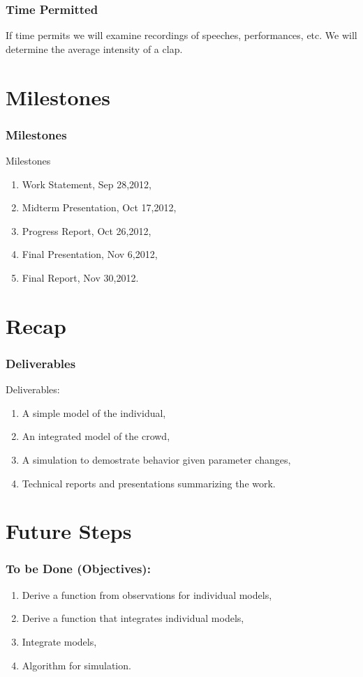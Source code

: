 \documentclass[compress,handout,10pt]{beamer}
\let\olditem\item
\renewcommand{\item}{\setlength{\itemsep}{0.5\baselineskip}\olditem}
\begin{document}
\begin{frame}
\frametitle{Time Permitted}
If time permits we will examine recordings of speeches, performances, etc. We will determine the average intensity of a clap.\\
\end{frame}

\section{Milestones}
\begin{frame}
\frametitle{Milestones}
Milestones
\begin{enumerate}
                 \item Work Statement, Sep 28,2012,
                 \item Midterm Presentation, Oct 17,2012,
                 \item Progress Report, Oct 26,2012,
                 \item Final Presentation, Nov 6,2012,
                 \item Final Report, Nov 30,2012.
             \end{enumerate}

\end{frame}
\section{Recap}
\begin{frame}
\frametitle{ Deliverables}
 Deliverables:
 \vspace{7pt}
	\begin{enumerate}
		\item A simple model of the individual,
		\item An integrated model of the crowd,
		\item A simulation to demostrate behavior given parameter changes,
		\item Technical reports and presentations summarizing the work.
	\end{enumerate}
\end{frame}
\section{Future Steps}
\begin{frame}

  \frametitle{To be Done (Objectives):}
	\begin{enumerate}
		\item Derive a function from observations for individual models,
		\item Derive a function that integrates individual models,
		\item Integrate models,
		\item Algorithm for simulation.
	\end{enumerate}
\end{frame}
\end{document}
